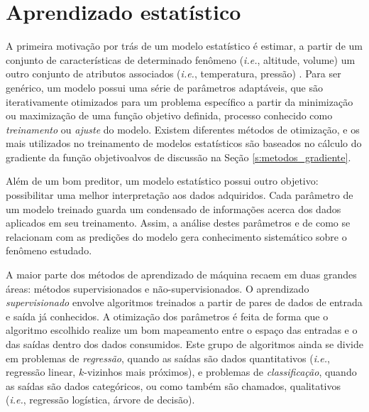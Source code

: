 
\chapter{Aprendizado estatístico}

  A primeira motivação por trás de um modelo estatístico é estimar, a partir de um conjunto de características de determinado fenômeno (\textit{i.e.}, altitude, volume) um outro conjunto de atributos associados (\textit{i.e.}, temperatura, pressão) . Para ser genérico, um modelo possui uma série de parâmetros adaptáveis, que são iterativamente otimizados para um problema específico a partir da minimização ou maximização de uma função objetivo definida, processo conhecido como \emph{treinamento} ou \emph{ajuste} do modelo. Existem diferentes métodos de otimização, e os mais utilizados no treinamento de modelos estatísticos são baseados no cálculo do gradiente da função objetivo\DIFdelbegin {}\DIFdelend \DIFaddbegin {}\DIFaddend alvos de discussão na Seção \ref{s:metodos_gradiente}.

  Além de um bom preditor, um modelo estatístico possui outro objetivo: possibilitar uma melhor interpretação aos dados adquiridos. Cada parâmetro de um modelo treinado guarda um condensado de informações acerca dos dados aplicados em seu treinamento. Assim, a análise destes parâmetros e de como se relacionam com as predições do modelo gera conhecimento sistemático sobre o fenômeno estudado.

  A maior parte dos métodos de aprendizado de máquina recaem em duas grandes áreas: métodos supervisionados e não-supervisionados. O aprendizado \emph{supervisionado} envolve algoritmos treinados a partir de pares de dados de entrada e saída já conhecidos. A otimização dos parâmetros é feita de forma que o algoritmo escolhido realize um bom mapeamento entre o espaço das entradas e o das saídas dentro dos dados consumidos. Este grupo de algoritmos ainda se divide em problemas de \emph{regressão}, quando as saídas são dados quantitativos (\textit{i.e.}, regressão linear, $k$-vizinhos mais próximos), e problemas de \emph{classificação}, quando as saídas são dados categóricos, ou como também são chamados, qualitativos (\textit{i.e.}, regressão logística, árvore de decisão).

